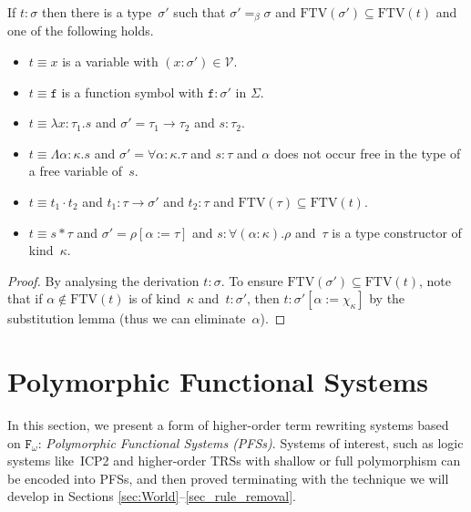 \documentclass[a4paper,UKenglish,cleveref,autoref,numberwithinsect]{lipics-v2019}
\theoremstyle{definition}
\newcommand{\Fomega}{\mathtt{F}_\omega}
\newcommand{\Vars}{\mathcal{V}}
\newcommand{\arrtype}{\rightarrow}
\newcommand{\quant}[2]{\forall #1.#2}
\newcommand{\app}[2]{#1 \cdot #2}
\newcommand{\tapp}[2]{#1 * #2}
\newcommand{\subst}[2]{#1:=#2}
\newcommand{\abs}[2]{\lambda #1.#2}
\newcommand{\tabs}[2]{\Lambda #1.#2}
\newcommand{\FTV}{\mathrm{FTV}}
\begin{document}
\begin{lemma}\label{lem:generation}
  If $t : \sigma$ then there is a type~$\sigma'$ such that
  $\sigma' =_\beta \sigma$ and $\FTV(\sigma') \subseteq \FTV(t)$ and
  one of the following holds.
  \begin{itemize}
  \item $t \equiv x$ is a variable with $(x : \sigma') \in \Vars$.
  \item $t \equiv \mathtt{f}$ is a function symbol with
    $\mathtt{f} : \sigma'$ in $\Sigma$.
  \item $t \equiv \abs{x:\tau_1}{s}$ and
    $\sigma'=\tau_1\arrtype\tau_2$ and $s : \tau_2$.
  \item $t \equiv \tabs{\alpha:\kappa}{s}$ and
    $\sigma' = \quant{\alpha:\kappa}{\tau}$ and $s : \tau$ and
    $\alpha$ does not occur free in the type of a free variable
    of~$s$.
  \item $t \equiv \app{t_1}{t_2}$ and $t_1 : \tau \arrtype \sigma'$
    and $t_2 : \tau$ and $\FTV(\tau) \subseteq \FTV(t)$.
  \item $t \equiv \tapp{s}{\tau}$ and
    $\sigma' = \rho[\subst{\alpha}{\tau}]$ and
    $s : \quant{(\alpha:\kappa)}{\rho}$ and~$\tau$ is a type
    constructor of kind~$\kappa$.
  \end{itemize}
\end{lemma}

\begin{proof}
  By analysing the derivation $t : \sigma$. To ensure
  $\FTV(\sigma') \subseteq \FTV(t)$, note that if
  $\alpha \notin \FTV(t)$ is of kind~$\kappa$ and~$t : \sigma'$, then
  $t : \sigma'[\subst{\alpha}{\chi_\kappa}]$ by the substitution lemma
  (thus we can eliminate~$\alpha$).
\end{proof}

\section{Polymorphic Functional Systems}\label{sec_systems}

In this section, we present a form of higher-order term rewriting
systems based on $\Fomega$: \emph{Polymorphic Functional Systems
  (PFSs)}. Systems of interest, such as logic systems like~ICP2 and
higher-order TRSs with shallow or full polymorphism can be encoded
into PFSs, and then proved terminating with the technique we will
develop in Sections \ref{sec:World}--\ref{sec_rule_removal}.
\end{document}
